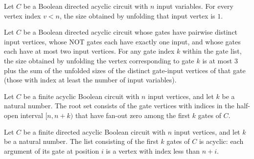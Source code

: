 \begin{theorem}
\label{BoolCircuit.DAGCircuit.unfoldSize_input}
\leanok
{}
Let $C$ be a Boolean directed acyclic circuit with $n$ input variables. For every vertex
index $v<n$, the size obtained by unfolding that input vertex is $1$.
\end{theorem}

\begin{theorem}
\label{BoolCircuit.DAGCircuit.unfoldSize_gate_le}
\leanok
{}
Let $C$ be a Boolean directed acyclic circuit whose gates have pairwise distinct input
vertices, whose NOT gates each have exactly one input, and whose gates each have at most
two input vertices. For any gate index $k$ within the gate list, the size obtained by
unfolding the vertex corresponding to gate $k$ is at most $3$ plus the sum of the
unfolded sizes of the distinct gate-input vertices of that gate (those with index at
least the number of input variables).
\end{theorem}

\begin{definition}
\label{BoolCircuit.DAGCircuit.rootSet}
\leanok
{}
Let $C$ be a finite acyclic Boolean circuit with $n$ input vertices, and let $k$ be a
natural number. The root set consists of the gate vertices with indices in the half-open
interval $[n,n+k)$ that have fan-out zero among the first $k$ gates of $C$.
\end{definition}

\begin{theorem}
\label{BoolCircuit.DAGCircuit.gatesAcyclic_take}
\leanok
{}
Let $C$ be a finite directed acyclic Boolean circuit with $n$ input vertices, and let
$k$ be a natural number. The list consisting of the first $k$ gates of $C$ is acyclic:
each argument of its gate at position $i$ is a vertex with index less than $n+i$.
\end{theorem}

